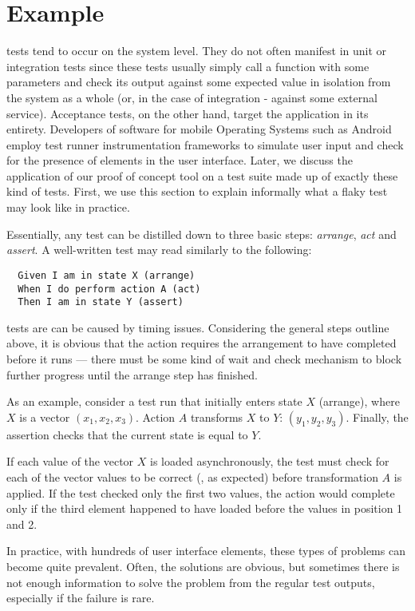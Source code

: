 \section{Example}
\label{sec:example}

\Flaky tests tend to occur on the system level. They do not often manifest in
unit or integration tests since these tests usually simply call a function with
some parameters and check its output against some expected value in isolation
from the system as a whole (or, in the case of integration - against some
external service). Acceptance tests, on the other hand, target the application
in its entirety. Developers of software for mobile Operating Systems such as
Android employ test runner instrumentation frameworks to simulate user input and
check for the presence of elements in the user interface. Later, we discuss the
application of our proof of concept tool on a test suite made up of exactly
these kind of tests. First, we use this section to explain informally what a
flaky test may look like in practice.

Essentially, any test can be distilled down to three basic steps:
\textit{arrange}, \textit{act} and \textit{assert}. A well-written test may read
similarly to the following:
\begin{verbatim}
  Given I am in state X (arrange)
  When I do perform action A (act)
  Then I am in state Y (assert)
\end{verbatim}

\Flaky tests are can be caused by timing issues. Considering the general steps
outline above, it is obvious that the action requires the arrangement to have
completed before it runs --- there must be some kind of wait and check mechanism
to block further progress until the arrange step has finished.

As an example, consider a test run that initially enters state $X$
(arrange), where $X$ is a vector $(x_{1}, x_{2}, x_{3})$. Action $A$
transforms $X$ to $Y$: $(y_{1}, y_{2}, y_{3})$. Finally, the assertion
checks that the current state is equal to $Y$.

If each value of the vector $X$ is loaded asynchronously, the test must check
for each of the vector values to be correct (\ie, as expected) before
transformation $A$ is applied. If the test checked only the first two values,
the action would complete only if the third element happened to have loaded
before the values in position 1 and 2.

In practice, with hundreds of user interface elements, these types of problems
can become quite prevalent. Often, the solutions are obvious, but sometimes
there is not enough information to solve the problem from the regular test
outputs, especially if the failure is rare.
